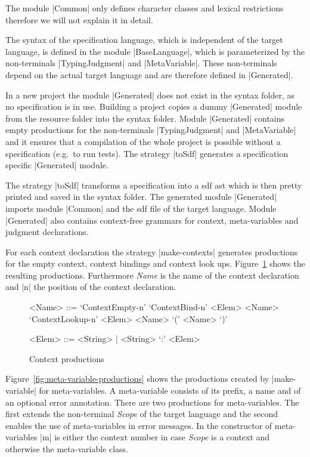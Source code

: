 The module \code|Common| only defines character classes and lexical
restrictions therefore we will not explain it in detail.

The syntax of the specification language, which is independent of the
target language, is defined in the module \code|BaseLanguage|, which
is parameterized by the non-terminals \code|TypingJudgment| and
\code|MetaVariable|. These non-terminals depend on the actual target
language and are therefore defined in \code|Generated|.

In a new project the module \code|Generated| does not exist in the
syntax folder, as no specification is in use. Building a project
copies a dummy \code|Generated| module from the resource folder into
the syntax folder. Module \code|Generated| contains empty productions
for the non-terminals \code|TypingJudgment| and \code|MetaVariable|
and it ensures that a compilation of the whole project is possible
without a specification (e.g.\ to run tests). The strategy
\code|toSdf| generates a specification specific \code|Generated|
module.

The strategy \code|toSdf| transforms a specification into a \gls{sdf}
\gls{ast} which is then pretty printed and saved in the syntax
folder. The generated module \code|Generated| imports module
\code|Common| and the \gls{sdf} file of the target language. Module
\code|Generated| also contains context-free grammars for context,
meta-variables and judgment declarations.

For each context declaration the strategy \code|make-contexts|
generates productions for the empty context, context bindings and
context look ups. Figure~\ref{fig:context-productions} shows the
resulting productions. Furthermore \textit{Name} is the name of the
context declaration and \code|n| the position of the context
declaration.


\begin{figure}
\begin{grammar}
  <Name> ::= `ContextEmpty-n'
  \alt `ContextBind-n' <Elem> <Name>
  \alt `ContextLookup-n' <Elem> <Name>
  \alt `(' <Name> `)'

  <Elem> ::= <String> | <String> `:' <Elem>
\end{grammar}
\caption{Context productions}
\label{fig:context-productions}
\end{figure}

Figure~\ref{fig:meta-variable-productions} shows the productions
created by \code|make-variable| for meta-variables. A meta-variable
consists of its prefix, a name and of an optional error
annotation. There are two productions for meta-variables. The first
extends the non-terminal \textit{Scope} of the target language and the
second enables the use of meta-variables in error messages. In the
constructor of meta-variables \code|m| is either the context number in
case \textit{Scope} is a context and otherwise the meta-variable
class.

